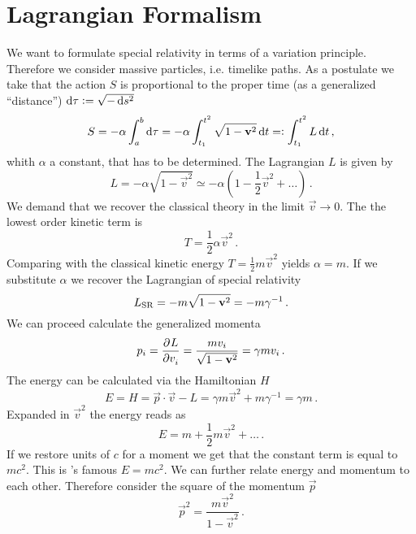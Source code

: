 \section{Lagrangian Formalism}
We want to formulate special relativity in terms of a variation principle.
Therefore we consider massive particles, i.e. timelike paths. As a postulate we
take that the action $S$ is proportional to the proper time (as a generalized
``distance'') $\dif \tau:=\sqrt{-\dif s^2}$
\begin{equation}
    S= -\alpha \int_a^b\dif \tau = -\alpha
    \int_{t_1}^{t^2}\sqrt{1-\vec{v}^2}\dif t =: \int_{t_1}^{t^2}L\dif t\, ,
\end{equation}
whith $\alpha$ a constant, that has to be determined. The Lagrangian $L$ is
given by
\begin{equation}
    L=-\alpha\sqrt{1-\vec{v}^2}\simeq
    -\alpha\left(1-\frac{1}{2}\vec{v}^2+\ldots\right) \, .
\end{equation}
We demand that we recover the classical theory in the limit $\vec{v}\to 0$. The
the lowest order kinetic term is
\begin{equation}
    T=\frac{1}{2}\alpha \vec{v}^2\, .
\end{equation}
Comparing with the classical kinetic energy $T=\frac{1}{2}m\vec{v}^2$ yields
$\alpha=m$. If we substitute $\alpha$ we recover the Lagrangian of
special relativity
\begin{equation}
    L\textsubscript{SR}=-m\sqrt{1-\vec{v}^2}=-m\gamma^{-1}\, .
\end{equation}
We can proceed calculate the generalized momenta
\begin{equation}
    p_i=\dpd{L}{v_i}=\frac{mv_i}{\sqrt{1-\vec{v}^2}}=\gamma m v_i\, .
\end{equation}
The energy can be calculated via the Hamiltonian $H$
\begin{equation}
    E=H=\vec{p}\cdot\vec{v}-L=\gamma m \vec{v}^2 + m\gamma^{-1} =\gamma m\, .
\end{equation}
Expanded in $\vec{v}^2$ the energy reads as
\begin{equation}
    E=m+\frac{1}{2}m\vec{v}^2+\ldots\, .
\end{equation}
If we restore units of $c$ for a moment we get that the constant term is
equal to $mc^2$. This is 's famous $E=mc^2$.
We can further relate energy and momentum to each other. Therefore consider the
square of the momentum $\vec{p}$
\begin{equation}
    \vec{p}^2=\frac{m\vec{v}^2}{1-\vec{v}^2}\, .
\end{equation}
